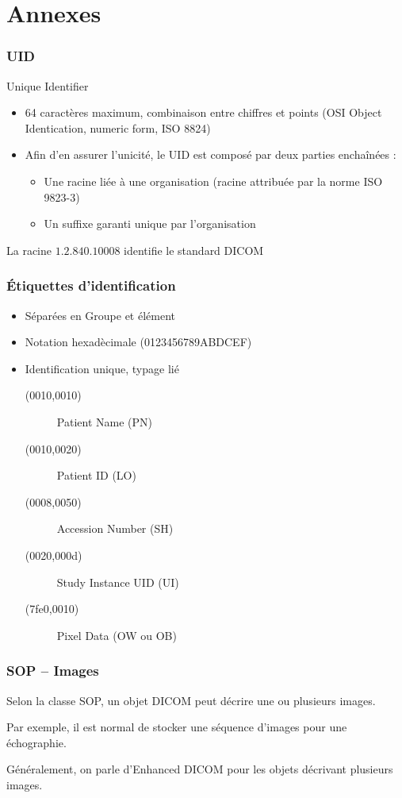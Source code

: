 \section*{Annexes}

\frame
{
	\frametitle{UID}
	Unique Identifier
	\begin{itemize}
		\item 64 caract\`eres maximum, combinaison entre chiffres et points (OSI Object Identication, numeric form, ISO 8824)
		\item Afin d'en assurer l'unicit\'e, le UID est compos\'e par deux parties encha\^in\'ees :
		\begin{itemize}
			\item Une racine li\'ee \`a une organisation (racine attribu\'ee par la norme ISO 9823-3)
			\item Un suffixe garanti unique par l'organisation
		\end{itemize}
	\end{itemize}
	La racine $1.2.840.10008$ identifie le standard DICOM
}

\frame
{
	\frametitle{\'Etiquettes d'identification}
	\begin{itemize}
		\item S\'epar\'ees en Groupe et \'el\'ement
		\item Notation hexad\`ecimale (0123456789ABDCEF)
		\item Identification unique, typage li\'e
		\begin{description}
			\item[(0010,0010)] Patient Name (PN)
			\item[(0010,0020)] Patient ID (LO)
			\item[(0008,0050)] Accession Number (SH)
			\item[(0020,000d)] Study Instance UID (UI)
			\item[(7fe0,0010)] Pixel Data (OW ou OB)
		\end{description}
	\end{itemize}
}


\frame
{
	\frametitle{SOP -- Images}
	Selon la classe SOP, un objet DICOM peut d\'ecrire une ou plusieurs images.
	
	Par exemple, il est normal de stocker une s\'equence d'images pour une \'echographie.
	
	G\'en\'eralement, on parle d'Enhanced DICOM pour les objets d\'ecrivant plusieurs images.
}

